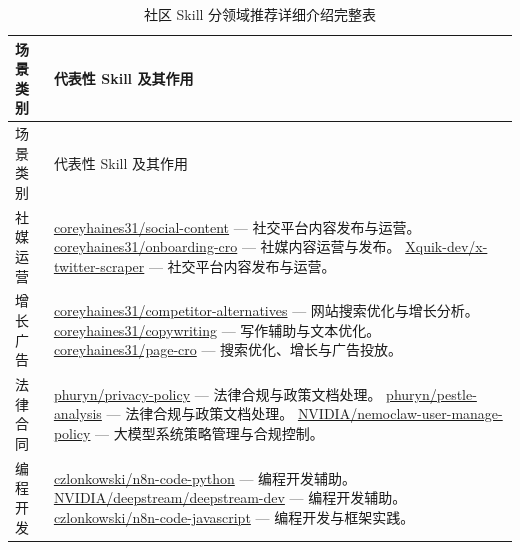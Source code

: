 \documentclass[UTF8,a4paper,12pt]{ctexart}
\begin{document}
\begingroup
\small
\begin{longtable}{p{2.6cm} p{12cm}}
\caption{社区 Skill 分领域推荐详细介绍完整表}\label{tab:appendix-community-summary}\\
\toprule
场景类别 & 代表性 Skill 及其作用 \\
\midrule
\endfirsthead
\toprule
场景类别 & 代表性 Skill 及其作用 \\
\midrule
\endhead
社媒运营 & \href{https://github.com/coreyhaines31/marketingskills/tree/main/skills/social-content}{coreyhaines31/social-content} — 社交平台内容发布与运营。
  \newline \href{https://github.com/coreyhaines31/marketingskills/tree/main/skills/onboarding-cro}{coreyhaines31/onboarding-cro} — 社媒内容运营与发布。
  \newline \href{https://github.com/Xquik-dev/x-twitter-scraper}{Xquik-dev/x-twitter-scraper} — 社交平台内容发布与运营。\\
\addlinespace
增长广告 & \href{https://github.com/coreyhaines31/marketingskills/tree/main/skills/competitor-alternatives}{coreyhaines31/competitor-alternatives} — 网站搜索优化与增长分析。
  \newline \href{https://github.com/coreyhaines31/marketingskills/tree/main/skills/copywriting}{coreyhaines31/copywriting} — 写作辅助与文本优化。
  \newline \href{https://github.com/coreyhaines31/marketingskills/tree/main/skills/page-cro}{coreyhaines31/page-cro} — 搜索优化、增长与广告投放。\\
\addlinespace
法律合同 & \href{https://github.com/phuryn/pm-skills/tree/main/pm-toolkit/skills/privacy-policy}{phuryn/privacy-policy} — 法律合规与政策文档处理。
  \newline \href{https://github.com/phuryn/pm-skills/tree/main/pm-product-strategy/skills/pestle-analysis}{phuryn/pestle-analysis} — 法律合规与政策文档处理。
  \newline \href{https://github.com/NVIDIA/skills/tree/main/skills/NemoClaw/nemoclaw-user-manage-policy}{NVIDIA/nemoclaw-user-manage-policy} — 大模型系统策略管理与合规控制。\\
\addlinespace
编程开发 & \href{https://github.com/czlonkowski/n8n-skills/tree/main/skills/n8n-code-python}{czlonkowski/n8n-code-python} — 编程开发辅助。
  \newline \href{https://github.com/NVIDIA/skills/tree/main/skills/deepstream/deepstream-dev}{NVIDIA/deepstream/deepstream-dev} — 编程开发辅助。
  \newline \href{https://github.com/czlonkowski/n8n-skills/tree/main/skills/n8n-code-javascript}{czlonkowski/n8n-code-javascript} — 编程开发与框架实践。\\

\end{longtable}
\end{document}
